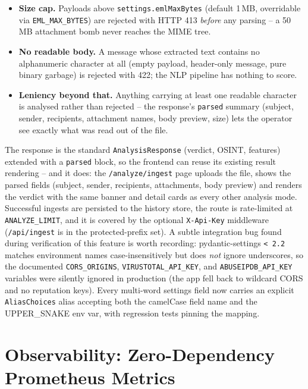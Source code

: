 \begin{itemize}
\item
  \textbf{Size cap.}  Payloads above \texttt{settings.emlMaxBytes}
  (default 1\,MB, overridable via \texttt{EML\_MAX\_BYTES}) are
  rejected with HTTP 413 \emph{before} any parsing -- a 50\,MB
  attachment bomb never reaches the MIME tree.
\item
  \textbf{No readable body.}  A message whose extracted text contains
  no alphanumeric character at all (empty payload, header-only
  message, pure binary garbage) is rejected with 422; the NLP
  pipeline has nothing to score.
\item
  \textbf{Leniency beyond that.}  Anything carrying at least one
  readable character is analysed rather than rejected -- the
  response's \texttt{parsed} summary (subject, sender, recipients,
  attachment names, body preview, size) lets the operator see exactly
  what was read out of the file.
\end{itemize}

The response is the standard \texttt{AnalysisResponse} (verdict,
OSINT, features) extended with a \texttt{parsed} block, so the frontend
can reuse its existing result rendering -- and it does: the
\texttt{/analyze/ingest} page uploads the file, shows the parsed
fields (subject, sender, recipients, attachments, body preview) and
renders the verdict with the same banner and detail cards as every
other analysis mode.  Successful ingests are
persisted to the history store, the route is rate-limited at
\texttt{ANALYZE\_LIMIT}, and it is covered by the optional
\texttt{X-Api-Key} middleware (\texttt{/api/ingest} is in the
protected-prefix set).  A subtle integration bug found during
verification of this feature is worth recording: pydantic-settings
\texttt{< 2.2} matches environment names case-insensitively but does
\emph{not} ignore underscores, so the documented \texttt{CORS\_ORIGINS},
\texttt{VIRUSTOTAL\_API\_KEY}, and \texttt{ABUSEIPDB\_API\_KEY}
variables were silently ignored in production (the app fell back to
wildcard CORS and no reputation keys).  Every multi-word settings
field now carries an explicit \texttt{AliasChoices} alias accepting
both the camelCase field name and the UPPER\_SNAKE env var, with
regression tests pinning the mapping.

\section{Observability: Zero-Dependency Prometheus Metrics}\label{prometheus-metrics}

